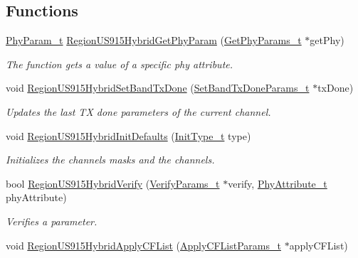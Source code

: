 \subsection*{Functions}
\begin{DoxyCompactItemize}
\item 
\hyperlink{group__REGION_gaed159b26e5c4677236b6e8677019db30}{Phy\+Param\+\_\+t} \hyperlink{group__REGIONUS915HYB_gaf078bd0d293c1a677ca53b7b6ca96c6e}{Region\+U\+S915\+Hybrid\+Get\+Phy\+Param} (\hyperlink{group__REGION_gab471483fff904f4f89bbc03f7fc380ab}{Get\+Phy\+Params\+\_\+t} $\ast$get\+Phy)
\begin{DoxyCompactList}\small\item\em The function gets a value of a specific phy attribute. \end{DoxyCompactList}\item 
void \hyperlink{group__REGIONUS915HYB_gaffb1cec48663f7fc2d7aeae9411e3d76}{Region\+U\+S915\+Hybrid\+Set\+Band\+Tx\+Done} (\hyperlink{group__REGION_gad0524aa0673c0814a71e7a4f9cade3fc}{Set\+Band\+Tx\+Done\+Params\+\_\+t} $\ast$tx\+Done)
\begin{DoxyCompactList}\small\item\em Updates the last TX done parameters of the current channel. \end{DoxyCompactList}\item 
void \hyperlink{group__REGIONUS915HYB_ga05e578b7048a754fbd73b71d3a938a7f}{Region\+U\+S915\+Hybrid\+Init\+Defaults} (\hyperlink{group__REGION_gaddc73ae10673ec925724e7870363bda9}{Init\+Type\+\_\+t} type)
\begin{DoxyCompactList}\small\item\em Initializes the channels masks and the channels. \end{DoxyCompactList}\item 
bool \hyperlink{group__REGIONUS915HYB_ga0fb0094a0833782259c6be87d3d4b141}{Region\+U\+S915\+Hybrid\+Verify} (\hyperlink{group__REGION_ga966d97bc2f25df1c09e92e60ef652276}{Verify\+Params\+\_\+t} $\ast$verify, \hyperlink{group__REGION_ga9445b07fdf77581ecfaf389970e635f8}{Phy\+Attribute\+\_\+t} phy\+Attribute)
\begin{DoxyCompactList}\small\item\em Verifies a parameter. \end{DoxyCompactList}\item 
void \hyperlink{group__REGIONUS915HYB_gadf2edbcb9c0e296e8de9fe4a40fc96ee}{Region\+U\+S915\+Hybrid\+Apply\+C\+F\+List} (\hyperlink{group__REGION_ga71588e9ad07e34b78fa91d51881fd3c6}{Apply\+C\+F\+List\+Params\+\_\+t} $\ast$apply\+C\+F\+List)

\end{DoxyCompactItemize}
